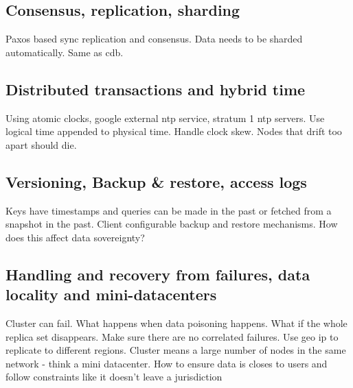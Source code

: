 \subsection{Consensus, replication, sharding} \label{sec:paxos}
Paxos based sync replication and consensus. Data needs to be sharded automatically. Same as cdb.
\subsection{Distributed transactions and hybrid time}
Using atomic clocks, google external ntp service, stratum 1 ntp servers. Use logical time appended to physical time. Handle clock skew. Nodes that drift too apart should die. 
\subsection{Versioning, Backup \& restore, access logs}
Keys have timestamps and queries can be made in the past or fetched from a snapshot in the past. Client configurable backup and restore mechanisms. How does this affect data sovereignty?
\subsection{Handling and recovery from  failures, data locality and mini-datacenters}
Cluster can fail. What happens when data poisoning happens. What if the whole replica set disappears. Make sure there are no correlated failures. Use geo ip to replicate to different regions. Cluster means a large number of nodes in the same network - think a mini datacenter. How to ensure data is closes to users and follow constraints like it doesn't leave a jurisdiction

